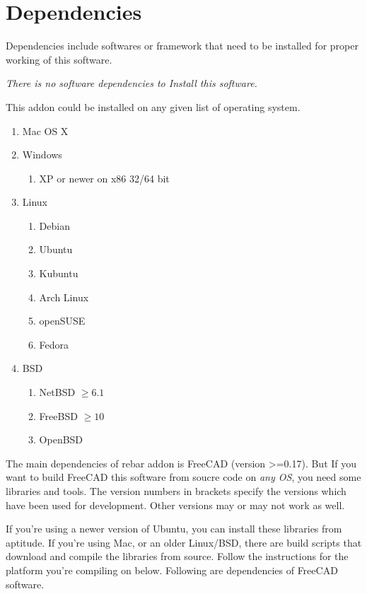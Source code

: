 \section{Dependencies}
Dependencies include softwares or framework that need to be installed for proper working of this software.

\emph{{\large There is no software dependencies to Install this software.}}

This addon could be installed on any given list of operating system.

\begin{enumerate}
	\item Mac OS X
	\item Windows
	 \begin{enumerate} 
	 	\item XP or newer on x86 32/64 bit
	 \end{enumerate}
	\item Linux
	\begin{enumerate} 
		\item Debian 
		\item Ubuntu 
		\item Kubuntu
		\item Arch Linux
		\item openSUSE
		\item Fedora
	 \end{enumerate}
	\item BSD
	\begin{enumerate}
		\item NetBSD  $\geq 6.1$
		\item FreeBSD $\geq 10 $
		\item OpenBSD
	\end{enumerate}
\end{enumerate}	 
 

The main dependencies of rebar addon is FreeCAD (version >=0.17). But If you want to build FreeCAD this software from soucre code on \emph{any OS}, you need some libraries and tools. The version
numbers in brackets specify the versions which have been used for
development. Other versions may or may not work as well.

If you're using a newer version of Ubuntu, you can install these 
libraries from aptitude. If you're using Mac, or an older Linux/BSD, there 
are build scripts that download and compile the libraries from source. 
Follow the instructions for the platform you're compiling on below. Following are
dependencies of FreeCAD software.


